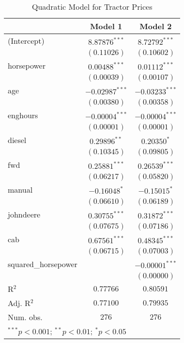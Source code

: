 
\begin{table}
\begin{center}
\begin{tabular}{l c c}
\hline
 & Model 1 & Model 2 \\
\hline
(Intercept)         & $8.87876^{***}$  & $8.72792^{***}$  \\
                    & $(0.11026)$      & $(0.10602)$      \\
horsepower          & $0.00488^{***}$  & $0.01112^{***}$  \\
                    & $(0.00039)$      & $(0.00107)$      \\
age                 & $-0.02987^{***}$ & $-0.03233^{***}$ \\
                    & $(0.00380)$      & $(0.00358)$      \\
enghours            & $-0.00004^{***}$ & $-0.00004^{***}$ \\
                    & $(0.00001)$      & $(0.00001)$      \\
diesel              & $0.29896^{**}$   & $0.20350^{*}$    \\
                    & $(0.10345)$      & $(0.09805)$      \\
fwd                 & $0.25881^{***}$  & $0.26539^{***}$  \\
                    & $(0.06217)$      & $(0.05820)$      \\
manual              & $-0.16048^{*}$   & $-0.15015^{*}$   \\
                    & $(0.06610)$      & $(0.06189)$      \\
johndeere           & $0.30755^{***}$  & $0.31872^{***}$  \\
                    & $(0.07675)$      & $(0.07186)$      \\
cab                 & $0.67561^{***}$  & $0.48345^{***}$  \\
                    & $(0.06715)$      & $(0.07003)$      \\
squared\_horsepower &                  & $-0.00001^{***}$ \\
                    &                  & $(0.00000)$      \\
\hline
R$^2$               & $0.77766$        & $0.80591$        \\
Adj. R$^2$          & $0.77100$        & $0.79935$        \\
Num. obs.           & $276$            & $276$            \\
\hline
\multicolumn{3}{l}{\scriptsize{$^{***}p<0.001$; $^{**}p<0.01$; $^{*}p<0.05$}}
\end{tabular}
\caption{Quadratic Model for Tractor Prices}
\label{tab:reg_sq_horse}
\end{center}
\end{table}
